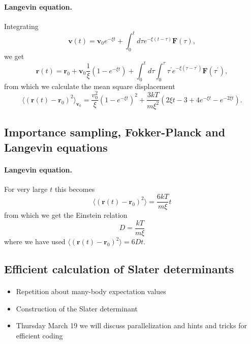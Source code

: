 \documentclass[%
twoside,                 %
final,                   %
10pt]{article}
\begin{document}
\paragraph{Langevin equation.}
Integrating 
 \[ 
\mathbf{v}(t)=\mathbf{v}_{0}e^{-\xi t}+\int_{0}^{t}d\tau e^{-\xi (t-\tau )}\mathbf{F }(\tau ), 
\] 
we get
\[
\mathbf{r}(t)=\mathbf{r}_{0}+\mathbf{v}_{0}\frac{1}{\xi }(1-e^{-\xi t})+
\int_0^td\tau \int_0^{\tau}\tau ^{\prime } e^{-\xi (\tau -\tau ^{\prime })}\mathbf{F}(\tau ^{\prime }), 
\]
from which we calculate the mean square displacement 
\[
\langle ( \mathbf{r}(t)-\mathbf{r}_{0})^{2}\rangle _{\mathbf{v}_{0}}=\frac{v_0^2}{\xi}(1-e^{-\xi t})^{2}+\frac{3kT}{m\xi ^{2}}(2\xi t-3+4e^{-\xi t}-e^{-2\xi t}). 
\]




\subsection*{Importance sampling, Fokker-Planck and Langevin equations}

\paragraph{Langevin equation.}
For very large $t$ this becomes
\[
\langle (\mathbf{r}(t)-\mathbf{r}_{0})^{2}\rangle =\frac{6kT}{m\xi }t 
\] 
from which we get the Einstein relation  
 \[ 
D= \frac{kT}{m\xi } 
\] 	
where we have used $\langle (\mathbf{r}(t)-\mathbf{r}_{0})^{2}\rangle =6Dt$.




\subsection*{Efficient calculation of Slater determinants}

\paragraph{}
\begin{itemize}
\item Repetition about many-body expectation values

\item Construction of the Slater determinant

\item Thursday March 19 we will discuss parallelization and hints and tricks for efficient coding
\end{itemize}
\end{document}

